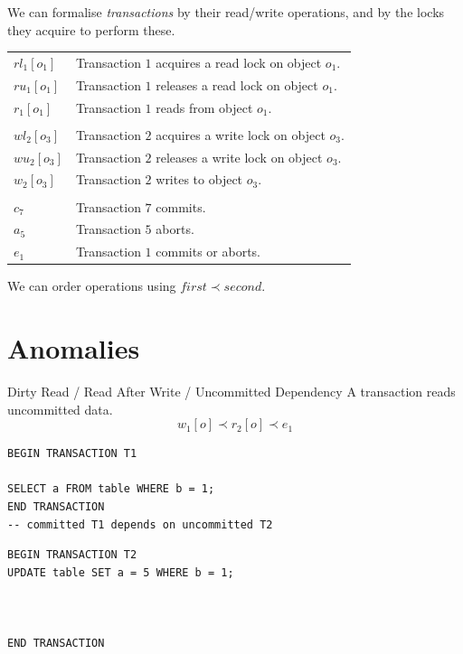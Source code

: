 \noindent We can formalise \textit{transactions} by their read/write operations, and by the locks they acquire to perform these.
\begin{center}
    \begin{tabular}{l l}
        $rl_1[o_1]$ & Transaction $1$ acquires a read lock on object $o_1$.  \\
        $ru_1[o_1]$ & Transaction $1$ releases a read lock on object $o_1$.  \\
        $r_1[o_1]$  & Transaction $1$ reads from object $o_1$.               \\
        \\
        $wl_2[o_3]$ & Transaction $2$ acquires a write lock on object $o_3$. \\
        $wu_2[o_3]$ & Transaction $2$ releases a write lock on object $o_3$. \\
        $w_2[o_3]$  & Transaction $2$ writes to object $o_3$.                \\
        \\
        $c_7$       & Transaction $7$ commits.                               \\
        $a_5$       & Transaction $5$ aborts.                                \\
        $e_1$       & Transaction $1$ commits or aborts.                     \\
    \end{tabular}
\end{center}
We can order operations using $first \prec second$.




\section{Anomalies}
\begin{definitionbox}{Dirty Read / Read After Write / Uncommitted Dependency}
    A transaction reads uncommitted data.
    \[w_1[o] \prec r_2[o] \prec e_1\]
    \tcblower
    \begin{minipage}[t]{.49\textwidth}
        \begin{verbatim}
BEGIN TRANSACTION T1

SELECT a FROM table WHERE b = 1;
END TRANSACTION
-- committed T1 depends on uncommitted T2
       \end{verbatim}
    \end{minipage} \hfill \begin{minipage}[t]{.49\textwidth}
        \begin{verbatim}
BEGIN TRANSACTION T2
UPDATE table SET a = 5 WHERE b = 1;



END TRANSACTION
       \end{verbatim}
    \end{minipage}
\end{definitionbox}

